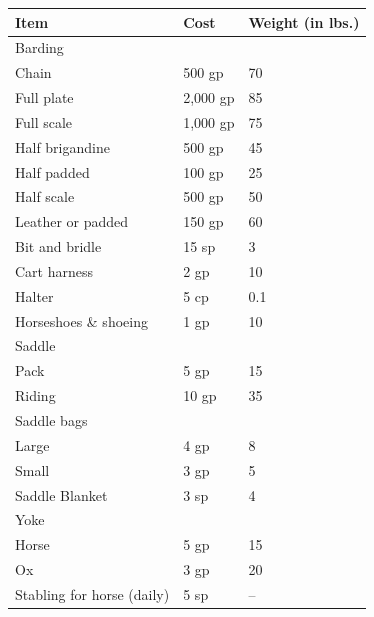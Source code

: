 \begin{multicols}{2}
\begin{minipage}{\columnwidth}
\label{tackharness}
\noindent
\begin{tabular}{|m{}|m{}|m{}|}
\hline
Item	& Cost	& Weight (in lbs.) \\
\hline\hline
\rowcolor[gray]{.9}Barding			& 	&  \\
\rowcolor[gray]{.9}\hspace{1em}Chain			& 500 gp	& 70 \\
\hspace{1em}Full plate	& 2,000 gp	& 85 \\
\rowcolor[gray]{.9}\hspace{1em}Full scale	& 1,000 gp	& 75 \\
\hspace{1em}Half brigandine	& 500 gp	& 45 \\
\rowcolor[gray]{.9}\hspace{1em}Half padded	& 100 gp	& 25 \\
\hspace{1em}Half scale	& 500 gp	& 50 \\
\rowcolor[gray]{.9}\hspace{1em}Leather or padded	& 150 gp	& 60 \\
Bit and bridle	& 15 sp	& 3 \\
\rowcolor[gray]{.9}Cart harness	& 2 gp	& 10 \\
Halter			& 5 cp	& 0.1 \\
\rowcolor[gray]{.9}Horseshoes \& shoeing	& 1 gp	& 10 \\
Saddle			& 	&  \\
\hspace{1em}Pack			& 5 gp	& 15 \\
\rowcolor[gray]{.9}\hspace{1em}Riding		& 10 gp	& 35 \\
Saddle bags		& 	&  \\
\hspace{1em}Large			& 4 gp	& 8 \\
\rowcolor[gray]{.9}\hspace{1em}Small			& 3 gp	& 5 \\
Saddle Blanket	& 3 sp	& 4 \\
\rowcolor[gray]{.9}Yoke			& 	&  \\
\rowcolor[gray]{.9}\hspace{1em}Horse			& 5 gp	& 15 \\
\hspace{1em}Ox			& 3 gp	& 20 \\
\rowcolor[gray]{.9}Stabling for horse (daily)	& 5 sp	& -- \\
\hline
\end{tabular}


\end{minipage}
\end{multicols}
